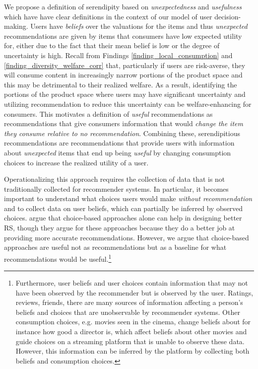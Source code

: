 \documentclass[sigconf]{acmart}
\begin{document}
We propose a definition of serendipity based on \textit{unexpectedness} and \textit{usefulness} which have have clear definitions in the context of our model of user decision-making. Users have \textit{beliefs} over the valuations for the items and thus \textit{unexpected} recommendations are given by items that consumers have low expected utility for, either due to the fact that their mean belief is low or the degree of uncertainty is high. Recall from Findings \ref{finding_local_consumption} and \ref{finding_diversity_welfare_corr} that, particularly if users are risk-averse, they will consume content in increasingly narrow portions of the product space and this may be detrimental to their realized welfare. As a result, identifying the portions of the product space where users may have significant uncertainty and utilizing recommendation to reduce this uncertainty can be welfare-enhancing for consumers. This motivates a definition of \textit{useful} recommendations as recommendations that give consumers information that would \textit{change the item they consume relative to no recommendation}. Combining these, serendipitious recommendations are recommendations that provide users with information about \textit{unexpected} items that end up being \textit{useful} by changing consumption choices to increase the realized utility of a user.

Operationalizing this approach requires the collection of data that is not traditionally collected for recommender systems. In particular, it becomes important to understand what choices users would make \textit{without recommendation} and to collect data on user beliefs, which can partially be inferred by observed choices. \cite{jiang2014choice, saavedra2016choice} argue that choice-based approaches alone can help in designing better RS, though they argue for these approaches because they do a better job at providing more accurate recommendations. However, we argue that choice-based approaches are useful not as recommendations but as a baseline for what recommendations would be useful.\footnote{Furthermore, user beliefs and user choices contain information that may not have been observed by the recommender but is observed by the user. Ratings, reviews, friends, there are many sources of information affecting a person's beliefs and choices that are unobservable by recommender systems. Other consumption choices, e.g. movies seen in the cinema, change beliefs about for instance how good a director is, which affect beliefs about other movies and guide choices on a streaming platform that is unable to observe these data. However, this information can be inferred by the platform by collecting both beliefs and consumption choices.}
\end{document}
